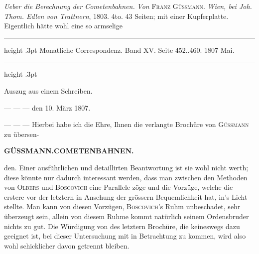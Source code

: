 \expandafter\def\csname HistoricalNoteText491\endcsname{\emph{Ueber die Berechnung der Cometenbahnen.} \emph{Von} \textsc{Franz Güssmann}. \emph{Wien, bei Joh. Thom. Edlen von Trattnern}, 1803. 4to. 43 Seiten; mit einer Kupferplatte. Eigentlich hätte wohl eine so armselige}
\par\bigskip
{}
\hypertarget{native-491-lower}{}\label{native-491-lower}
\begin{center}\parbox{.85\linewidth}{\centering\small
\hrule height .3pt\relax\vspace{2.5pt}
Monatliche Correspondenz. Band XV. Seite 452..460. 1807 Mai.\par
\vspace{2.5pt}\hrule height .3pt\relax
}\end{center}
\begin{center}Auszug aus einem Schreiben.\end{center}
\begin{flushright}--- --- --- den 10. März 1807.\end{flushright}

--- --- --- Hierbei habe ich die Ehre, Ihnen die verlangte Brochüre von \textsc{Güssmann} zu übersen-\par
\clearpage
\endgroup
\begingroup
\pagestyle{empty}
\newcommand{\GaussVIGathering}[2]{%
  \fancypagestyle{gaussVIGathering}{%
    \fancyhf{}%
    \renewcommand{\headrulewidth}{0pt}%
    \renewcommand{\footrulewidth}{0pt}%
    \fancyfoot[C]{\makebox[\textwidth][l]{%
      \hspace*{.025\textwidth}{\footnotesize\bfseries #1}\hfill
      {\normalsize\bfseries\textls[90]{#2}}\hspace*{.18\textwidth}}}%
  }%
  \thispagestyle{gaussVIGathering}%
}
\noindent{}%
\makebox[12mm][l]{}%
\parbox[t]{\dimexpr\linewidth-24mm\relax}{\centering\footnotesize\bfseries GÜSSMANN.\enspace COMETENBAHNEN.\par}%
\par\nobreak\medskip
\noindent den. Einer ausführlichen und detaillirten Beantwortung ist sie wohl nicht werth; diese könnte nur dadurch interessant werden, dass man zwischen den Methoden von \textsc{Olbers} und \textsc{Boscovich} eine Parallele zöge und die Vorzüge, welche die erstere vor der letztern in Ansehung der grössern Bequemlichkeit hat, in's Licht stellte. Man kann von diesen Vorzügen, \textsc{Boscovich}'s Ruhm unbeschadet, sehr überzeugt sein, allein von diesem Ruhme kommt natürlich seinem Ordensbruder nichts zu gut. Die Würdigung von des letztern Brochüre, die keineswegs dazu geeignet ist, bei dieser Untersuchung mit in Betrachtung zu kommen, wird also wohl schicklicher davon getrennt bleiben.

